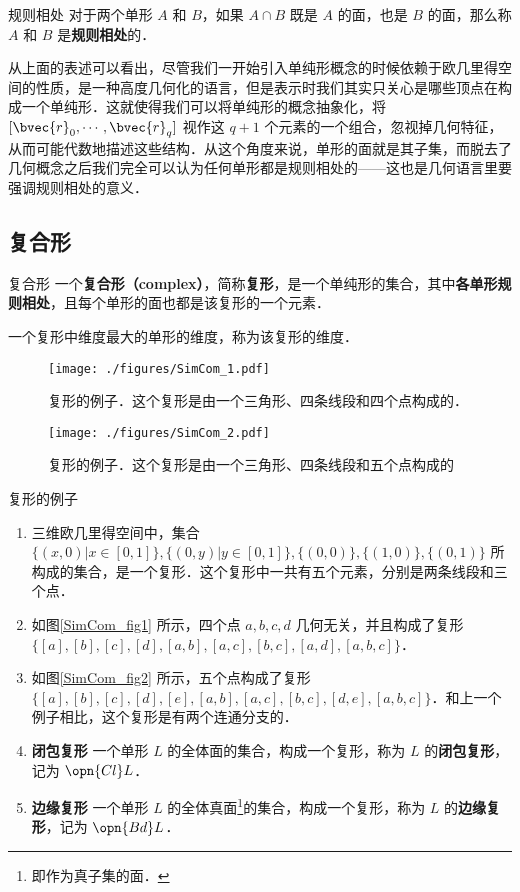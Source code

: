 \begin{definition}{规则相处}
对于两个单形 $A$ 和 $B$，如果 $A\cap B$ 既是 $A$ 的面，也是 $B$ 的面，那么称 $A$ 和 $B$ 是\textbf{规则相处}的．
\end{definition}


从上面的表述可以看出，尽管我们一开始引入单纯形概念的时候依赖于欧几里得空间的性质，是一种高度几何化的语言，但是表示时我们其实只关心是哪些顶点在构成一个单纯形．这就使得我们可以将单纯形的概念抽象化，将 $[\bvec{r}_0, \cdots, \bvec{r}_q]$ 视作这 $q+1$ 个元素的一个组合，忽视掉几何特征，从而可能代数地描述这些结构．从这个角度来说，单形的面就是其子集，而脱去了几何概念之后我们完全可以认为任何单形都是规则相处的——这也是几何语言里要强调规则相处的意义．

\subsection{复合形}

\begin{definition}{复合形}
一个\textbf{复合形（complex）}，简称\textbf{复形}，是一个单纯形的集合，其中\textbf{各单形规则相处}，且每个单形的面也都是该复形的一个元素．

一个复形中维度最大的单形的维度，称为该复形的维度．
\end{definition}

\begin{figure}[ht]
\centering
\texttt{[image: ./figures/SimCom\_1.pdf]}
\caption{复形的例子．这个复形是由一个三角形、四条线段和四个点构成的．} \label{SimCom_fig1}
\end{figure}

\begin{figure}[ht]
\centering
\texttt{[image: ./figures/SimCom\_2.pdf]}
\caption{复形的例子．这个复形是由一个三角形、四条线段和五个点构成的} \label{SimCom_fig2}
\end{figure}


\begin{example}{复形的例子}
\begin{enumerate}
\item 三维欧几里得空间中，集合 $\{(x, 0)|x\in[0,1]\}, \{(0, y)|y\in[0, 1]\}, \{(0, 0)\}, \{(1, 0)\}, \{(0, 1)\}$ 所构成的集合，是一个复形．这个复形中一共有五个元素，分别是两条线段和三个点．
\item 如图\autoref{SimCom_fig1} 所示，四个点 $a, b, c, d$ 几何无关，并且构成了复形 $\{[a], [b], [c], [d], [a, b], [a, c], [b, c], [a, d], [a, b, c]\}$．
\item 如图\autoref{SimCom_fig2} 所示，五个点构成了复形 $\{[a], [b], [c], [d], [e], [a, b], [a, c], [b, c], [d, e], [a, b, c]\}$．和上一个例子相比，这个复形是有两个连通分支的．
\item \textbf{闭包复形} 一个单形 $L$ 的全体面的集合，构成一个复形，称为 $L$ 的\textbf{闭包复形}，记为 $\opn{Cl} L$．
\item \textbf{边缘复形} 一个单形 $L$ 的全体真面\footnote{即作为真子集的面．}的集合，构成一个复形，称为 $L$ 的\textbf{边缘复形}，记为 $\opn{Bd} L$．
\end{enumerate}
\end{example}

